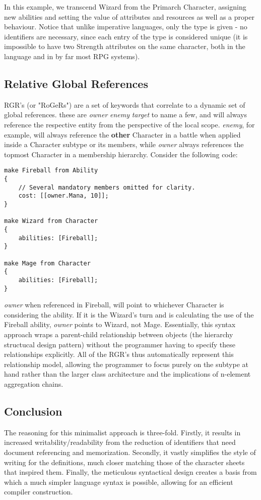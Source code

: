 In this example, we transcend Wizard from the Primarch Character, assigning new abilities and setting the value of attributes and resources as well as a proper behaviour. Notice that unlike imperative languages, only the type is given - no identifiers are necessary, since each entry of the type is considered unique (it is impossible to have two Strength attributes on the same character, both in the language and in by far most RPG systems).

\subsection{Relative Global References}
RGR's (or "RoGeRs") are a set of keywords that correlate to a dynamic set of global references. these are \emph{owner} \emph{enemy} \emph{target} to name a few, and will always reference the respective entity from the perspective of the local scope. \emph{enemy}, for example, will always reference the \textbf{other} Character in a battle when applied inside a Character subtype or its members, while \emph{owner} always references the topmost Character in a membership hierarchy. Consider the following code:

\begin{lstlisting}
make Fireball from Ability
{
	// Several mandatory members omitted for clarity.
	cost: [[owner.Mana, 10]];
}

make Wizard from Character
{
	abilities: [Fireball];
}

make Mage from Character
{
	abilities: [Fireball];
}
\end{lstlisting}

\emph{owner} when referenced in Fireball, will point to whichever Character is considering the ability. If it is the Wizard's turn and is calculating the use of the Fireball ability, \emph{owner} points to Wizard, not Mage. Essentially, this syntax approach wraps a parent-child relationship between objects (the hierarchy structucal design pattern) without the programmer having to specify these relationships explicitly. All of the RGR's thus automatically represent this relationship model, allowing the programmer to focus purely on the subtype at hand rather than the larger class architecture and the implications of n-element aggregation chains.

\subsection{Conclusion}

The reasoning for this minimalist approach is three-fold. Firstly, it results in increased writability/readability from the reduction of identifiers that need document referencing and memorization. Secondly, it vastly simplifies the style of writing for the definitions, much closer matching those of the character sheets that inspired them. Finally, the meticulous syntactical design creates a basis from which a much simpler language syntax is possible, allowing for an efficient compiler construction.